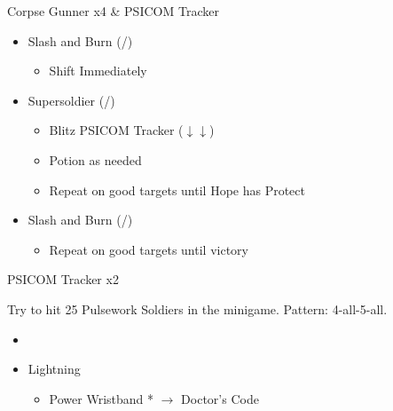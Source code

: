 \begin{multicols}{2}

\renewcommand{\first}{[1] Slash and Burn (\com/\rav)}
\renewcommand{\second}{[2] Supersoldier (\com/\syn)}

\begin{battle}{Corpse Gunner x4 \& PSICOM Tracker}
\begin{itemize}
    \item \first
    \begin{itemize}
        \item Shift Immediately
    \end{itemize}
    \item \second
    \begin{itemize}
        \item Blitz PSICOM Tracker ($\downarrow\downarrow$)
        \item Potion as needed
        \item Repeat on good targets until Hope has Protect
    \end{itemize}
    \item \first
    \begin{itemize}
        \item Repeat on good targets until victory
    \end{itemize}
\end{itemize}
 
\end{battle}
\begin{battle}{PSICOM Tracker x2}
 
\end{battle}

Try to hit 25 Pulsework Soldiers in the minigame. Pattern: 4-all-5-all.

\begin{menu}
\begin{itemize}
    \paradigm
    \begin{itemize}
        \item {}%
{\paradigmline{\com}{\rav}{}}%
{\paradigmline[2]{\textit{\com}}{\textit{\syn}}{}}%
{\paradigmline{\med}{\med}{}}%
{\paradigmline{\rav}{\rav}{}}%
{\paradigmline{[\rav]}{\rav}{}}%
    \end{itemize}
    \equip
    \begin{itemize}
        \item Lightning
        \begin{itemize}
                \item Power Wristband * $\rightarrow$ Doctor's Code
        \end{itemize}
    \end{itemize}
\end{itemize}
\end{menu}


\end{multicols}
